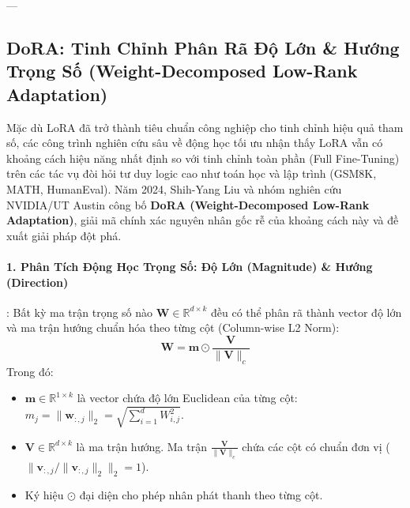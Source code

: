 ---

\subsection{DoRA: Tinh Chỉnh Phân Rã Độ Lớn \& Hướng Trọng Số (Weight-Decomposed Low-Rank Adaptation)}
\label{sec:dora-math-decomposition}

Mặc dù LoRA đã trở thành tiêu chuẩn công nghiệp cho tinh chỉnh hiệu quả tham số, các công trình nghiên cứu sâu về động học tối ưu nhận thấy LoRA vẫn có khoảng cách hiệu năng nhất định so với tinh chỉnh toàn phần (Full Fine-Tuning) trên các tác vụ đòi hỏi tư duy logic cao như toán học và lập trình (GSM8K, MATH, HumanEval).
Năm 2024, Shih-Yang Liu và nhóm nghiên cứu NVIDIA/UT Austin công bố \textbf{DoRA (Weight-Decomposed Low-Rank Adaptation)}, giải mã chính xác nguyên nhân gốc rễ của khoảng cách này và đề xuất giải pháp đột phá.

\paragraph{1. Phân Tích Động Học Trọng Số: Độ Lớn (Magnitude) \& Hướng (Direction)}:
Bất kỳ ma trận trọng số nào $\mathbf{W} \in \mathbb{R}^{d \times k}$ đều có thể phân rã thành vector độ lớn và ma trận hướng chuẩn hóa theo từng cột (Column-wise L2 Norm):
\begin{equation}
\mathbf{W} = \mathbf{m} \odot \frac{\mathbf{V}}{\|\mathbf{V}\|_c}
\end{equation}
Trong đó:
\begin{itemize}
  \item $\mathbf{m} \in \mathbb{R}^{1 \times k}$ là vector chứa độ lớn Euclidean của từng cột: $m_j = \|\mathbf{w}_{:, j}\|_2 = \sqrt{\sum_{i=1}^d W_{i, j}^2}$.
  \item $\mathbf{V} \in \mathbb{R}^{d \times k}$ là ma trận hướng. Ma trận $\frac{\mathbf{V}}{\|\mathbf{V}\|_c}$ chứa các cột có chuẩn đơn vị ($\|\mathbf{v}_{:, j} / \|\mathbf{v}_{:, j}\|_2\|_2 = 1$).
  \item Ký hiệu $\odot$ đại diện cho phép nhân phát thanh theo từng cột.
\end{itemize}

